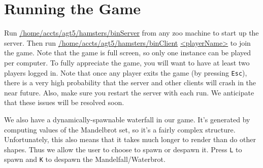 \documentclass{amsart}
\begin{document}
\section*{Running the Game}
\noindent
Run \url{/home/accts/agt5/hamsters/binServer} from any zoo machine to start up the server. Then run
\url{/home/accts/agt5/hamsters/binClient} \url{<playerName>} to join the game. Note that the game is full screen, so 
only one instance can be played per computer. To fully appreciate the game, you will want to 
have at least two players logged in. Note that once any player exits the game (by pressing \texttt{Esc}), there
is a very high probability that the server and other clients will crash in the near future. Also, make
sure you restart the server with each run. We anticipate that these issues will be resolved soon.

\vspace{10pt} \noindent
We also have a dynamically-spawnable waterfall in our game. It's generated by computing values of the Mandelbrot
set, so it's a fairly complex structure. Unfortunately, this also means that it takes much longer to render than
do other shapes. Thus we allow the user to choose to spawn or despawn it. Press \texttt{L} to spawn and \texttt{K}
to despawn the Mandelfall/Waterbrot.
\end{document}
